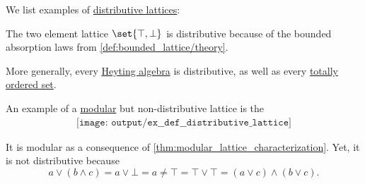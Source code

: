 \begin{example}\label{ex:def:distributive_lattice}
  We list examples of \hyperref[def:distributive_lattice]{distributive lattices}:
  \begin{thmenum}
     The two element lattice \( \set{ \top, \bot } \) is distributive because of the bounded absorption laws from \cref{def:bounded_lattice/theory}.

    More generally, every \hyperref[def:heyting_algebra]{Heyting algebra} is distributive, as well as every \hyperref[def:totally_ordered_set]{totally ordered set}.

     An example of a \hyperref[def:modular_lattice]{modular} but non-distributive lattice is the 
    \begin{equation}\label{eq:ex:def:distributive_lattice/diamond}\tag{\( M_3 \)}
      \begin{aligned}
        \texttt{[image: output/ex\_\_def\_\_distributive\_lattice]}
      \end{aligned}
    \end{equation}

    It is modular as a consequence of \cref{thm:modular_lattice_characterization}. Yet, it is not distributive because
    \begin{equation*}
      a \vee (b \wedge c) = a \vee \bot = a
      \neq
      \top = \top \vee \top = (a \vee c) \wedge (b \vee c).
    \end{equation*}
  \end{thmenum}
\end{example}

